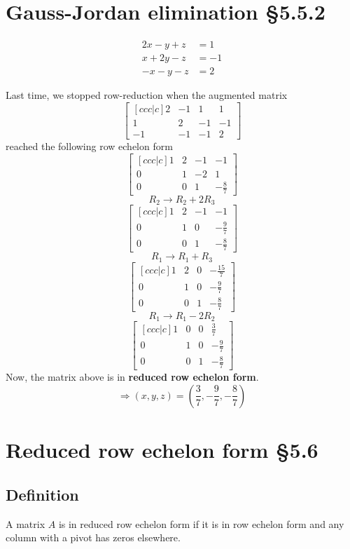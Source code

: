 \documentclass[11pt]{article}
\begin{document}
\section{Gauss-Jordan elimination §5.5.2}
\begin{align*}
2x - y + z &= 1 \\
x + 2y - z &= -1 \\
-x - y - z &= 2
\end{align*}

Last time, we stopped row-reduction when the augmented matrix 
\[
\begin{bmatrix}[ccc|c]
2 & -1 & 1 & 1 \\
1 & 2 & -1 & -1 \\
-1 & -1 & -1 & 2
\end{bmatrix}
\]
reached the following row echelon form
\[
\begin{bmatrix}[ccc|c]
1 & 2 & -1 & -1 \\
0 & 1 & -2 & 1 \\
0 & 0 & 1 & -\frac{8}{7}
\end{bmatrix}
\]
\[ R_2 \rightarrow R_2 + 2R_3 \]
\[
\begin{bmatrix}[ccc|c]
1 & 2 & -1 & -1 \\
0 & 1 & 0 & -\frac{9}{7} \\
0 & 0 & 1 & -\frac{8}{7}
\end{bmatrix}
\]
\[ R_1 \rightarrow R_1 + R_3 \]
\[
\begin{bmatrix}[ccc|c]
1 & 2 & 0 & -\frac{15}{7} \\
0 & 1 & 0 & -\frac{9}{7} \\
0 & 0 & 1 & -\frac{8}{7}
\end{bmatrix}
\]
\[ R_1 \rightarrow R_1 - 2R_2\]
\[
\begin{bmatrix}[ccc|c]
1 & 0 & 0 & \frac{3}{7} \\
0 & 1 & 0 & -\frac{9}{7} \\
0 & 0 & 1 & -\frac{8}{7}
\end{bmatrix}
\]
Now, the matrix above is in \textbf{reduced row echelon form}.
\[ \Rightarrow (x, y, z) = \left( \frac{3}{7}, -\frac{9}{7}, -\frac{8}{7} \right) \]

\section{Reduced row echelon form §5.6}
\subsection{Definition}
A matrix $A$ is in reduced row echelon form if it is in row echelon form and any column with a pivot has zeros elsewhere.
\end{document}
